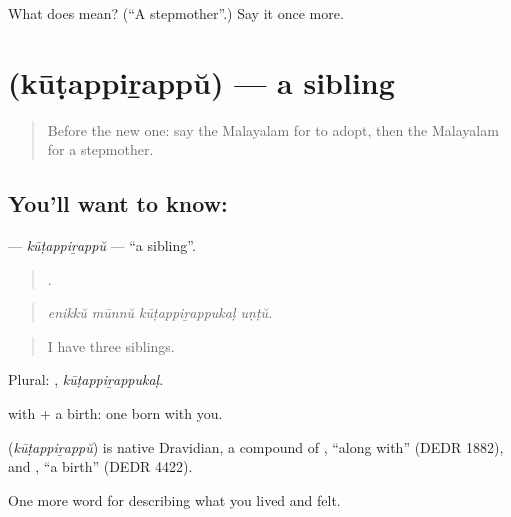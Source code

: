 \begin{tcolorbox}[breakable,colback=teal!4,colframe=teal!35!black,title={Before you move on}]
What does  mean? (\textquotedblleft{}A stepmother\textquotedblright{}.) Say it once more.
\end{tcolorbox}
\section[\texorpdfstring{\ml{കൂടപ്പിറപ്പ്} (kūṭappiṟappŭ)}{കൂടപ്പിറപ്പ് (kūṭappiṟappŭ)}]{ (kūṭappiṟappŭ) — a sibling}

\label{lesson:ML-C553-kutappirappu}



\begin{quote}
Before the new one: say the Malayalam for to adopt, then the Malayalam for a stepmother.
\end{quote}

\subsection*{You'll want to know: }
\textbf{} — \emph{kūṭappiṟappŭ} — \textquotedblleft{}a sibling\textquotedblright{}.

\begin{quote}
   .
\end{quote}

\begin{quote}
\emph{enikkŭ mūnnŭ kūṭappiṟappukaḷ uṇṭŭ.}
\end{quote}

\begin{quote}
I have three siblings.
\end{quote}

Plural: , \emph{kūṭappiṟappukaḷ}.

 with +  a birth: one born with you.

\begin{cousinweb}
\textbf{} (\emph{kūṭappiṟappŭ}) is native Dravidian, a compound of , \textquotedblleft{}along with\textquotedblright{} (DEDR 1882), and , \textquotedblleft{}a birth\textquotedblright{} (DEDR 4422).
\end{cousinweb}

\begin{grammarlens}[title={What you've built}]
One more word for describing what you lived and felt.
\end{grammarlens}

